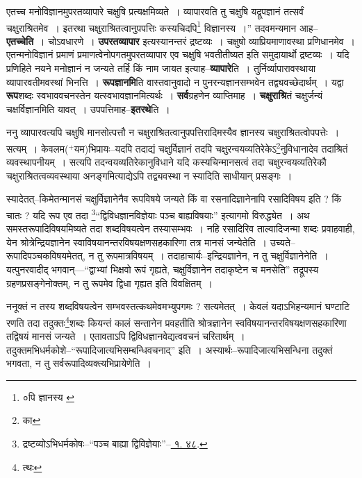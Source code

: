 \documentclass[article,12pt,a4paper]{memoir}
\newcommand{\add}[1]{($^{+}$#1)}
\begin{document}
	एतच्च मनोविज्ञानमुपरतव्यापारे चक्षुषि प्रत्यक्षमिव्यते । व्यापारवति तु चक्षुषि यद्रूपज्ञानं तत्सर्वं चक्षुराश्रितमेव । इतरथा चक्षुराश्रितत्वानुपपत्तिः कस्यचिदपि\footnote{०पि ज्ञानस्य \cite{dp-msB} \cite{dp-msD}} विज्ञानस्य ।” तदवमन्यमान आह--\textbf{एतच्चेति} । चोऽवधारणे । \textbf{उपरतव्यापार} इत्यस्यानन्तरं द्रष्टव्यः । चक्षुषो व्याप्रियमाणावस्था प्रणिधानमेव । एतन्मनोविज्ञानं प्रमाणं प्रमाणत्वेनोपगतमुपरतव्यापार एव चक्षुषि भवतीतीष्यत इति समुदायार्थो द्रष्टव्यः । यदि प्रणिहिते नयने मनोज्ञानं न जन्यते तर्हि किं नाम जायत इत्याह--\textbf{व्यापारे}ति । तुर्निर्व्यापारावस्थाया व्यापारवतीमवस्थां भिनत्ति । \textbf{रूपज्ञानमि}ति वास्तवानुवादो न पुनरन्यज्ञानसम्भवेन तद्व्यवच्छेदार्थम् । यद्वा \textbf{रूप}शब्दः स्वभाववचनस्तेन यत्स्वभावज्ञानमित्यर्थः । \textbf{सर्व}ग्रहणेन व्याप्तिमाह । \textbf{चक्षुराश्रि}तं चक्षुर्जन्यं चक्षर्विज्ञानमिति यावत् । उपपत्तिमाह--\textbf{इतरथे}ति ।
	\pend
      

	  \pstart ननु व्यापारवत्यपि चक्षुषि मानसोत्पत्तौ न चक्षुराश्रितत्वानुपपत्तिरादिमस्यैव ज्ञानस्य चक्षुराश्रितत्वोपपत्तेः । सत्यम् । केवलम\add{यम}भिप्रायः--यदपि तदाद्यं चक्षुर्विज्ञानं तदपि चक्षुरन्वयव्यतिरेकेऽ\footnote{का}नुविधानादेव तदाश्रितं व्यवस्थापनीयम् । सत्यपि तदन्वयव्यतिरेकानुविधाने यदि कस्यचिन्मानसत्वं तदा चक्षुरन्वयव्यतिरेकौ चक्षुराश्रितत्वव्यवस्थाया अनङ्गमित्याद्येऽपि तद्व्यवस्था न स्यादिति साधीयान् प्रसङ्गः ।
	\pend
      

	  \pstart स्यादेतत्--किमेतन्मानसं चक्षुर्विज्ञानेनैव रूपविषये जन्यते किं वा रसनादिज्ञानेनापि रसादिविषय इति ? किं चातः ? यदि रूप एव तदा \footnote{द्रष्टव्योऽभिधर्मकोषः--“पञ्च बाह्या द्विविज्ञेयाः”--\href{http://http://sarit.indology.info/?cref=ak.1.48}{ १. ४८}.}“द्विविधज्ञानविज्ञेयाः पञ्च बाह्यविषयाः” इत्यागमो विरुद्ध्येत । अथ समस्तरूपादिविषयमिष्यते तदा शब्दविषयत्वेन तस्यासम्भवः । नहि रसादिरिव ताल्वादिजन्मा शब्दः प्रवाहवाही, येन श्रोत्रेन्द्रियज्ञानेन स्वाविषयानन्तरविषयक्षणसहकारिणा तत्र मानसं जन्येतेति । उच्यते--रूपादिपञ्चकविषयमेतत्, न तु रूपमात्रविषयम् । तदाहाचार्यः--इन्द्रियज्ञानेन, न तु चक्षुर्विज्ञानेनेति । यत्पुनरवादीद् भगवान्—“द्वाभ्यां भिक्षवो रूपं गृह्यते, चक्षुर्विज्ञानेन तदाकृष्टेन च मनसेति” तद्रूपस्य ग्रहणप्रसङ्गेनोक्तम्, न तु रूपमेव द्विधा गृह्यत इति विवक्षितम् ।
	\pend
      

	  \pstart ननूक्तं न तस्य शब्दविषयत्वेन सम्भवस्तत्कथमेवमभ्युपगमः ? सत्यमेतत् । केवलं यदाऽभिहन्यमानं घण्टाटि रणति तदा तदुक्तः\footnote{त्थः}शब्दः कियन्तं कालं सन्तानेन प्रवहतीति श्रोत्रज्ञानेन स्वविषयानन्तरविषयक्षणसहकारिणा तद्विषयं मानसं जन्यते । एतावताऽपि द्विविधज्ञानवेद्यत्ववचनं चरितार्थम् । तदुक्तमभिधर्मकोशे--“रूपादिजात्यभिसम्बन्धिवचनाद्” इति । अस्यार्थः--रूपादिजात्यभिसन्धिना तदुक्तं भगवता, न तु \leavevmode{} सर्वरूपादिव्यक्त्यभिप्रायेणेति ।
	\pend
      
\end{document}
